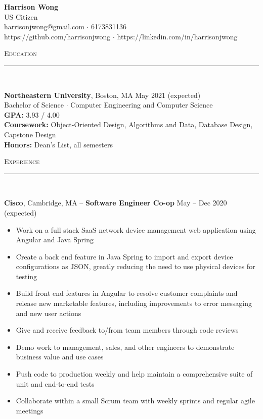 \documentclass[11pt]{article}
\begin{document}
\small
\center
	\textbf{\huge Harrison Wong}  \\
	\vspace{0.05in}
	US Citizen \\
	harrisonjwong@gmail.com $\cdot$ 6173831136 \\
	https://github.com/harrisonjwong $\cdot$ https://linkedin.com/in/harrisonjwong \\
	\vspace{0.1in}
	
\begin{raggedright}

	\textsc{\Large Education} \\
	\vspace{-0.1in}
	\rule{\textwidth}{0.4pt} \\
	\vspace{0.05in}

	\textbf{\large Northeastern University}, Boston, MA 
	\hfill May 2021 (expected) \\
	Bachelor of Science $\cdot$ Computer Engineering and Computer Science \\
	\textbf{GPA:} \hspace{33pt} 3.93 / 4.00 \\
	\textbf{Coursework:} Object-Oriented Design, Algorithms and Data, Database Design, Capstone Design \\
	\textbf{Honors:} \hspace {19pt} Dean's List, all semesters
	\vspace{0.1in}
	
	\textsc{\Large Experience} \\
	\vspace{-0.1in}
	\rule{\textwidth}{0.4pt} \\
	\vspace{0.05in}
	
	\textbf{\large Cisco}, Cambridge, MA -- \textbf{Software Engineer Co-op}
	\hfill May -- Dec 2020 (expected) \\
		\begin{itemize}
			\item Work on a full stack SaaS network device management web application using Angular and Java Spring
			\item Create a back end feature in Java Spring to import and export device configurations as JSON, greatly reducing the need to use physical devices for testing
			\item Build front end features in Angular to resolve customer complaints and release new marketable features, including improvements to error messaging and new user actions
			\item Give and receive feedback to/from team members through code reviews
			\item Demo work to management, sales, and other engineers to demonstrate business value and use cases
			\item Push code to production weekly and help maintain a comprehensive suite of unit and end-to-end tests
			\item Collaborate within a small Scrum team with weekly sprints and regular agile meetings
		\end{itemize}
	\vspace{0.1in}


\end{raggedright}
\end{document}

